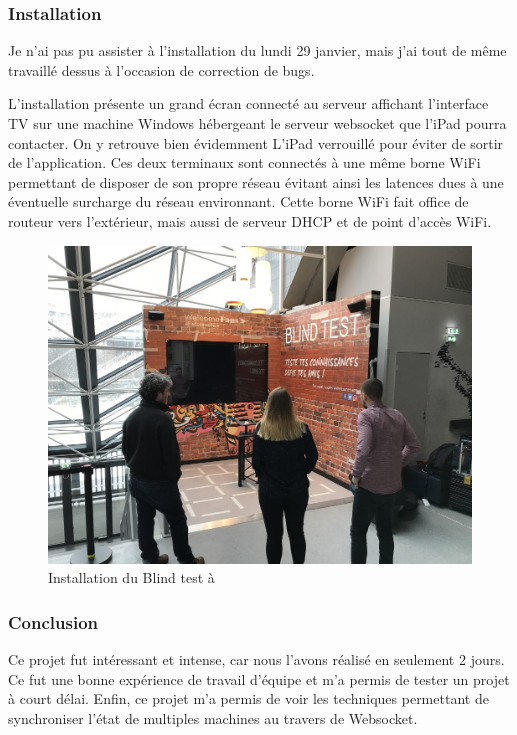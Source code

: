\subsubsection{Installation}

Je n'ai pas pu assister à l'installation du lundi 29 janvier, mais j'ai tout de même travaillé dessus à l'occasion de correction de bugs.

L'installation présente un grand écran connecté au serveur affichant l'interface TV sur une machine Windows hébergeant le serveur websocket que l'iPad pourra contacter.
On y retrouve bien évidemment L'iPad verrouillé pour éviter de sortir de l'application.
Ces deux terminaux sont connectés à une même borne WiFi permettant de disposer de son propre réseau évitant ainsi les latences dues à une éventuelle surcharge du réseau environnant.
Cette borne WiFi fait office de routeur vers l'extérieur, mais aussi de serveur DHCP et de point d'accès WiFi.

\begin{figure}[h]
    \centering
    \includegraphics[scale=0.4]{img/accorhotel-blindtest-resize.jpg}
    \caption{Installation du Blind test à \aha}
\end{figure}

\subsubsection{Conclusion}

Ce projet fut intéressant et intense, car nous l'avons réalisé en seulement 2 jours.
Ce fut une bonne expérience de travail d'équipe et m'a permis de tester un projet à court délai.
Enfin, ce projet m'a permis de voir les techniques permettant de synchroniser l'état de multiples machines au travers de Websocket.
